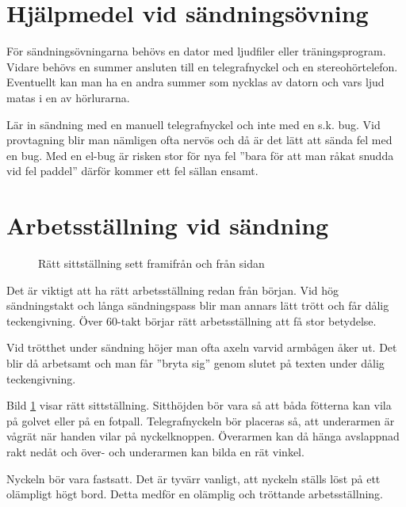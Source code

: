 \section[Övningshjälpmedel]{Hjälpmedel vid sändningsövning}

För sändningsövningarna behövs en dator med ljudfiler eller träningsprogram.
Vidare behövs en summer ansluten till en telegrafnyckel och en stereohörtelefon.
Eventuellt kan man ha en andra summer som nycklas av datorn och vars ljud matas
i en av hörlurarna.

Lär in sändning med en manuell telegrafnyckel och inte med en s.k. bug.
Vid provtagning blir man nämligen ofta nervös och då är det lätt att sända fel
med en bug.
Med en el-bug är risken stor för nya fel ''bara för att man råkat snudda vid fel
paddel'' därför kommer ett fel sällan ensamt.

\section[Ställning]{Arbetsställning vid sändning}

\begin{figure}
  \caption{Rätt sittställning sett framifrån och från sidan}
  \label{fig:bild_morse_3_4}
\end{figure}

Det är viktigt att ha rätt arbetsställning redan från början.
Vid hög sändningstakt och långa sändningspass blir man annars lätt trött och
får dålig teckengivning.
Över 60-takt börjar rätt arbetsställning att få stor betydelse.

Vid trötthet under sändning höjer man ofta axeln varvid armbågen åker ut.
Det blir då arbetsamt och man får ''bryta sig'' genom slutet på texten under
dålig teckengivning.

Bild \ref{fig:bild_morse_3_4} visar rätt sittställning.
Sitthöjden bör vara så att båda fötterna kan vila på golvet eller på en fotpall.
Telegrafnyckeln bör placeras så, att underarmen är vågrät när handen vilar på
nyckelknoppen.
Överarmen kan då hänga avslappnad rakt nedåt och över- och underarmen kan bilda
en rät vinkel.

Nyckeln bör vara fastsatt. Det är tyvärr vanligt, att nyckeln ställs löst på ett
olämpligt högt bord. Detta medför en olämplig och tröttande arbetsställning.

